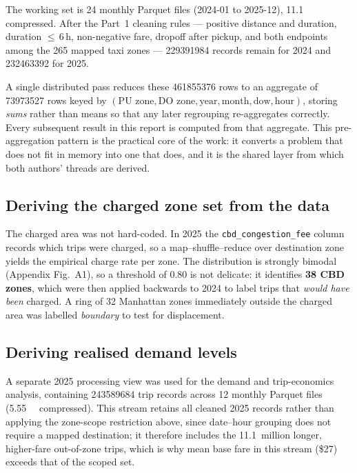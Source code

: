 \documentclass[10pt,a4paper]{article}
\begin{document}
The working set is 24 monthly Parquet files (2024-01 to 2025-12),
\SI{11.1}{\giga\byte} compressed. After the Part~1 cleaning rules --- positive
distance and duration, duration $\leq$\,6\,h, non-negative fare, dropoff after
pickup, and both endpoints among the 265 mapped taxi zones --- \num{229391984}
records remain for 2024 and \num{232463392} for 2025.

A single distributed pass reduces these \num{461855376} rows to an aggregate of
\num{73973527} rows keyed by
$(\text{PU zone},\text{DO zone},\text{year},\text{month},\text{dow},\text{hour})$,
storing \emph{sums} rather than means so that any later regrouping re-aggregates
correctly. Every subsequent result in this report is computed from that
aggregate. This pre-aggregation pattern is the practical core of the work: it
converts a problem that does not fit in memory into one that does, and it is the
shared layer from which both authors' threads are derived.

\subsection{Deriving the charged zone set from the data}

The charged area was not hard-coded. In 2025 the \texttt{cbd\_congestion\_fee}
column records which trips were charged, so a map--shuffle--reduce over
destination zone yields the empirical charge rate per zone. The distribution is
strongly bimodal (Appendix Fig.~A1), so a threshold of \num{0.80} is not
delicate: it identifies \textbf{38 CBD zones}, which were then applied backwards
to 2024 to label trips that \emph{would have been} charged. A ring of 32
Manhattan zones immediately outside the charged area was labelled
\emph{boundary} to test for displacement.

\subsection{Deriving realised demand levels}

A separate 2025 processing view was used for the demand and trip-economics
analysis, containing \num{243589684} trip records across 12 monthly Parquet files
(\SI{5.55}{\giga\byte} compressed). This stream retains all cleaned 2025 records
rather than applying the zone-scope restriction above, since date--hour grouping
does not require a mapped destination; it therefore includes the 11.1~million
longer, higher-fare out-of-zone trips, which is why mean base fare in this stream
(\$27) exceeds that of the scoped set.
\end{document}
